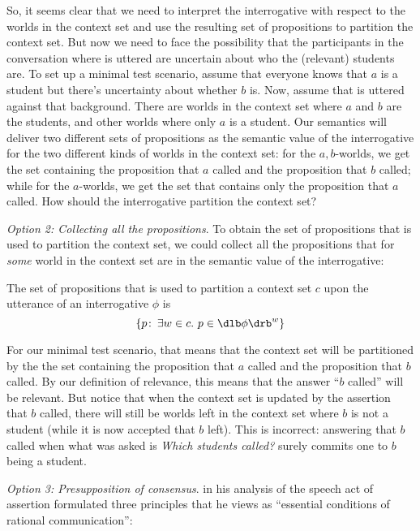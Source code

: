 So, it seems clear that we need to interpret the interrogative with respect to
the worlds in the context set and use the resulting set of propositions to
partition the context set. But now we need to face the possibility that the
participants in the conversation where \Last is uttered are uncertain about who
the (relevant) students are. To set up a minimal test scenario, assume that
everyone knows that $a$ is a student but there's uncertainty about whether $b$
is. Now, assume that \Last is uttered against that background. There are worlds
in the context set where $a$ and $b$ are the students, and other worlds where
only $a$ is a student. Our semantics will deliver two different sets of
propositions as the semantic value of the interrogative for the two different
kinds of worlds in the context set: for the $a,b$-worlds, we get the set
containing the proposition that $a$ called and the proposition that $b$ called;
while for the $a$-worlds, we get the set that contains only the proposition that
$a$ called. How should the interrogative partition the context set?

\clearpage
\emph{Option 2: Collecting all the propositions}. To obtain the set of
propositions that is used to partition the context set, we could collect all the
propositions that for \emph{some} world in the context set are in the semantic
value of the interrogative:

\ex The set of propositions that is used to partition a context set $c$ upon
the utterance of an interrogative $\phi$ is
\[\{p\co \exists w\in c.\ p\in\sv{\phi}^w\}\]
\xe

For our minimal test scenario, that means that the context set will be
partitioned by the the set containing the proposition that $a$ called and the
proposition that $b$ called. By our definition of relevance, this means that the
answer ``$b$ called'' will be relevant. But notice that when the context set is
updated by the assertion that $b$ called, there will still be worlds left in the
context set where $b$ is not a student (while it is now accepted that $b$ left).
This is incorrect: answering that $b$ called when what was asked is \emph{Which
  students called?} surely commits one to $b$ being a student.

\emph{Option 3: Presupposition of consensus}. \cite{stalnaker-1978-assertion} in
his analysis of the speech act of assertion formulated three principles that he
views as ``essential conditions of rational communication'':

